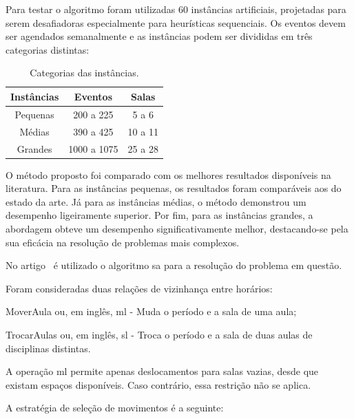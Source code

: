Para testar o algoritmo foram utilizadas 60 instâncias artificiais, projetadas para serem desafiadoras especialmente para heurísticas sequenciais. Os eventos devem ser agendados semanalmente e as instâncias podem ser divididas em três categorias distintas:

{
\setlength{\tabcolsep}{.8em}
\begin{table}[H]
    \centering
    \caption{Categorias das instâncias.}
    \label{tabela:categorias-instancias}
    \begin{tabular}{ccc}
    \toprule
    Instâncias & Eventos     & Salas   \\ \midrule
    Pequenas   & 200 a 225   & 5 a 6   \\
    Médias     & 390 a 425   & 10 a 11 \\
    Grandes    & 1000 a 1075 & 25 a 28 \\
    \bottomrule
    \end{tabular}
\end{table}
}

O método proposto foi comparado com os melhores resultados disponíveis na literatura. Para as instâncias pequenas, os resultados foram comparáveis aos do estado da arte. Já para as instâncias médias, o método demonstrou um desempenho ligeiramente superior. Por fim, para as instâncias grandes, a abordagem obteve um desempenho significativamente melhor, destacando-se pela sua eficácia na resolução de problemas mais complexos.

No artigo~\cite{Featurebasedtuning-Bellio-2016} é utilizado o algoritmo \gls{sa} para a resolução do problema em questão.

Foram consideradas duas relações de vizinhança entre horários:

\begin{compactitem}
    \item MoverAula ou, em inglês, \gls{ml} - Muda o período e a sala de uma aula;

    \item TrocarAulas ou, em inglês, \gls{sl} - Troca o período e a sala de duas aulas de disciplinas distintas.
\end{compactitem}

A operação \gls{ml} permite apenas deslocamentos para salas vazias, desde que existam espaços disponíveis. Caso contrário, essa restrição não se aplica.

A estratégia de seleção de movimentos é a seguinte:

